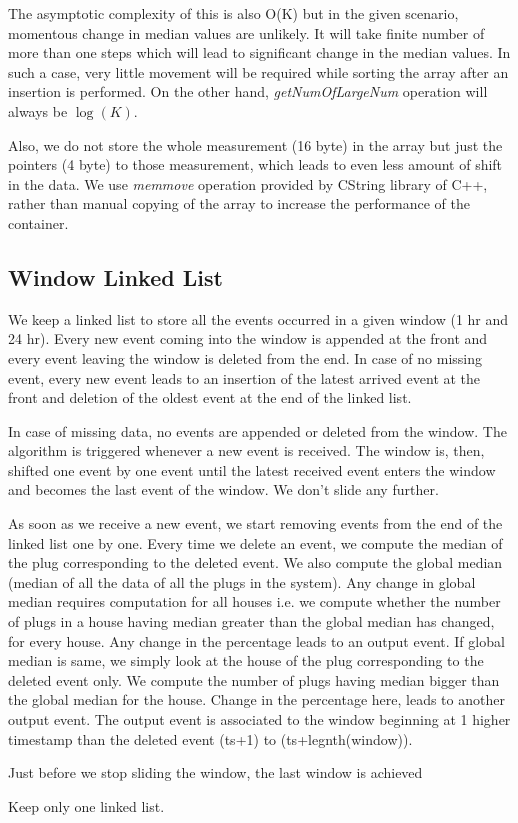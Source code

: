 The asymptotic complexity of this is also O(K) but in the given scenario, momentous change in median values are unlikely. It will take finite number of more than one steps which will lead to significant change in the median values. In such a case, very little movement will be required while sorting the array after an insertion is performed. On the other hand, \textit{getNumOfLargeNum} operation will always be $\log(K)$.

Also, we do not store the whole measurement (16 byte) in the array but just the pointers (4 byte) to those measurement, which leads to even less amount of shift in the data. We use \textit{memmove} operation provided by CString library of C++, rather than manual copying of the array to increase the performance of the container.

\subsection{Window Linked List}
We keep a linked list to store all the events occurred in a given window (1 hr and 24 hr). Every new event coming into the window is appended at the front and every event leaving the window is deleted from the end. In case of no missing event, every new event leads to an insertion of the latest arrived event at the front and deletion of the oldest event at the end of the linked list.


 In case of missing data, no events are appended or deleted from the window. The algorithm is triggered whenever a new event is received. The window is, then, shifted one event by one event until the latest received event enters the window and becomes the last event of the window. We don't slide any further.

As soon as we receive a new event, we start removing events from the end of the linked list one by one. Every time we delete an event, we compute the median of the plug corresponding to the deleted event. We also compute the global median (median of all the data of all the plugs in the system). Any change in global median requires computation for all houses i.e. we compute whether the number of plugs in a house having median greater than the global median has changed, for every house. Any change in the percentage leads to an output event. If global median is same, we simply look at the house of the plug corresponding to the deleted event only. We compute the number of plugs having median bigger than the global median for the house. Change in the percentage here, leads to another output event. The output event is associated to the window beginning at 1 higher timestamp than the deleted event (ts+1) to (ts+legnth(window)).

Just before we stop sliding the window, the last window is achieved 


Keep only one linked list.
